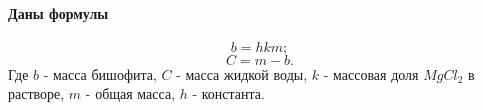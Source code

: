 \paragraph{Даны формулы}
$$b = h k m;$$
$$C = m - b.$$
Где $b$ - масса бишофита, $C$ - масса жидкой воды, $k$ - массовая доля $MgCl_2$ в растворе, $m$ - общая масса, $h$ - константа.

